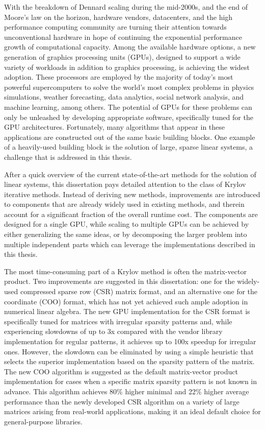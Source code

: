 With the breakdown of Dennard scaling during the mid-2000s, and the end of
Moore's law on the horizon, hardware vendors, datacenters, and the high
performance computing community are turning their attention towards
unconventional hardware in hope of continuing the exponential performance growth
of computational capacity. Among the available hardware options, a new
generation of graphics processing units (GPUs), designed to support a wide
variety of workloads in addition to graphics processing, is achieving the widest
adoption.  These processors are employed by the majority of today's most
powerful supercomputers to solve the world's most complex problems in physics
simulations, weather forecasting, data analytics, social network analysis, and
machine learning, among others. The potential of GPUs for these problems can
only be unleashed by developing appropriate software, specifically tuned for the
GPU architectures. Fortunately, many algorithms that appear in these
applications are constructed out of the same basic building blocks. One example
of a heavily-used building block is the solution of large, sparse linear
systems, a challenge that is addressed in this thesis.

After a quick overview of the current state-of-the-art methods for the solution
of linear systems, this dissertation pays detailed attention to the class of
Krylov iterative methods.  Instead of deriving new methods, improvements are
introduced to components that are already widely used in existing methods, and
therein account for a significant fraction of the overall runtime cost. The
components are designed for a single GPU, while scaling to multiple GPUs can be
achieved by either generalizing the same ideas, or by decomposing the larger
problem into multiple independent parts which can leverage the implementations
described in this thesis.

The most time-consuming part of a Krylov method is often the matrix-vector
product. Two improvements are suggested in this dissertation: one for the
widely-used compressed sparse row (CSR) matrix format, and an alternative one
for the coordinate (COO) format, which has not yet achieved such ample adoption
in numerical linear algebra. The new GPU implementation for the CSR format is
specifically tuned for matrices with irregular sparsity patterns and, while
experiencing slowdowns of up to 3x compared with the vendor library
implementation for regular patterns, it achieves up to 100x speedup for
irregular ones. However, the slowdown can be eliminated by using a simple
heuristic that selects the superior implementation based on the sparsity pattern
of the matrix. The new COO algorithm is suggested as the default matrix-vector
product implementation for cases when a specific matrix sparsity pattern is not
known in advance. This algorithm achieves 80\% higher minimal and 22\% higher
average performance than the newly developed CSR algorithm on a variety of large
matrices arising from real-world applications, making it an ideal default choice
for general-purpose libraries.

